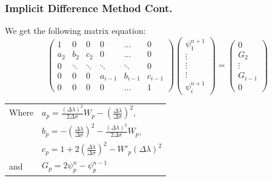 \begin{frame}
\frametitle{Implicit Difference Method Cont.}
We get the following matrix equation:
\[
\begin{pmatrix}
  1&0&0&0&\ldots&0 \\
  a_2&b_2&c_2&0&\ldots&0\\
  0&\ddots&\ddots&\ddots&\ddots&0\\
  0&0&0&a_{i-1}&b_{i-1}&c_{i-1}\\
	0&0&0&0&\ldots&1
\end{pmatrix}
\begin{pmatrix}
\psi_1^{n+1}\\
\vdots\\
\vdots\\
\vdots\\
\psi_i^{n+1}
\end{pmatrix}=
\begin{pmatrix}
0\\
G_2\\
\vdots\\
G_{i-1}\\
0
\end{pmatrix}
\]

\begin{tabular}{ll}\vspace{2mm}
Where &$a_p=\frac{(\Delta\lambda)^2}{2\Delta\sigma} W_p-(\frac{\Delta\lambda}{\Delta\sigma})^2$,\\ \vspace{2mm} &$b_p=-(\frac{\Delta\lambda}{\Delta\sigma})^2-\frac{(\Delta\lambda)^2}{2\Delta\sigma}W_p$,\\ \vspace{2mm} &$c_p=1+2(\frac{\Delta\lambda}{\Delta\sigma})^2-W'_p(\Delta\lambda)^2$ \\
and &$G_p=2\psi^n_p-\psi^{n-1}_p$
\end{tabular}
\end{frame}


